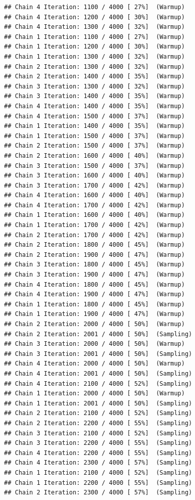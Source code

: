 \documentclass[
]{article}
\begin{document}
\begin{verbatim}
## Chain 4 Iteration: 1100 / 4000 [ 27%]  (Warmup) 
## Chain 4 Iteration: 1200 / 4000 [ 30%]  (Warmup) 
## Chain 4 Iteration: 1300 / 4000 [ 32%]  (Warmup) 
## Chain 1 Iteration: 1100 / 4000 [ 27%]  (Warmup) 
## Chain 1 Iteration: 1200 / 4000 [ 30%]  (Warmup) 
## Chain 1 Iteration: 1300 / 4000 [ 32%]  (Warmup) 
## Chain 2 Iteration: 1300 / 4000 [ 32%]  (Warmup) 
## Chain 2 Iteration: 1400 / 4000 [ 35%]  (Warmup) 
## Chain 3 Iteration: 1300 / 4000 [ 32%]  (Warmup) 
## Chain 3 Iteration: 1400 / 4000 [ 35%]  (Warmup) 
## Chain 4 Iteration: 1400 / 4000 [ 35%]  (Warmup) 
## Chain 4 Iteration: 1500 / 4000 [ 37%]  (Warmup) 
## Chain 1 Iteration: 1400 / 4000 [ 35%]  (Warmup) 
## Chain 1 Iteration: 1500 / 4000 [ 37%]  (Warmup) 
## Chain 2 Iteration: 1500 / 4000 [ 37%]  (Warmup) 
## Chain 2 Iteration: 1600 / 4000 [ 40%]  (Warmup) 
## Chain 3 Iteration: 1500 / 4000 [ 37%]  (Warmup) 
## Chain 3 Iteration: 1600 / 4000 [ 40%]  (Warmup) 
## Chain 3 Iteration: 1700 / 4000 [ 42%]  (Warmup) 
## Chain 4 Iteration: 1600 / 4000 [ 40%]  (Warmup) 
## Chain 4 Iteration: 1700 / 4000 [ 42%]  (Warmup) 
## Chain 1 Iteration: 1600 / 4000 [ 40%]  (Warmup) 
## Chain 1 Iteration: 1700 / 4000 [ 42%]  (Warmup) 
## Chain 2 Iteration: 1700 / 4000 [ 42%]  (Warmup) 
## Chain 2 Iteration: 1800 / 4000 [ 45%]  (Warmup) 
## Chain 2 Iteration: 1900 / 4000 [ 47%]  (Warmup) 
## Chain 3 Iteration: 1800 / 4000 [ 45%]  (Warmup) 
## Chain 3 Iteration: 1900 / 4000 [ 47%]  (Warmup) 
## Chain 4 Iteration: 1800 / 4000 [ 45%]  (Warmup) 
## Chain 4 Iteration: 1900 / 4000 [ 47%]  (Warmup) 
## Chain 1 Iteration: 1800 / 4000 [ 45%]  (Warmup) 
## Chain 1 Iteration: 1900 / 4000 [ 47%]  (Warmup) 
## Chain 2 Iteration: 2000 / 4000 [ 50%]  (Warmup) 
## Chain 2 Iteration: 2001 / 4000 [ 50%]  (Sampling) 
## Chain 3 Iteration: 2000 / 4000 [ 50%]  (Warmup) 
## Chain 3 Iteration: 2001 / 4000 [ 50%]  (Sampling) 
## Chain 4 Iteration: 2000 / 4000 [ 50%]  (Warmup) 
## Chain 4 Iteration: 2001 / 4000 [ 50%]  (Sampling) 
## Chain 4 Iteration: 2100 / 4000 [ 52%]  (Sampling) 
## Chain 1 Iteration: 2000 / 4000 [ 50%]  (Warmup) 
## Chain 1 Iteration: 2001 / 4000 [ 50%]  (Sampling) 
## Chain 2 Iteration: 2100 / 4000 [ 52%]  (Sampling) 
## Chain 2 Iteration: 2200 / 4000 [ 55%]  (Sampling) 
## Chain 3 Iteration: 2100 / 4000 [ 52%]  (Sampling) 
## Chain 3 Iteration: 2200 / 4000 [ 55%]  (Sampling) 
## Chain 4 Iteration: 2200 / 4000 [ 55%]  (Sampling) 
## Chain 4 Iteration: 2300 / 4000 [ 57%]  (Sampling) 
## Chain 1 Iteration: 2100 / 4000 [ 52%]  (Sampling) 
## Chain 1 Iteration: 2200 / 4000 [ 55%]  (Sampling) 
## Chain 2 Iteration: 2300 / 4000 [ 57%]  (Sampling) 

\end{verbatim}
\end{document}
